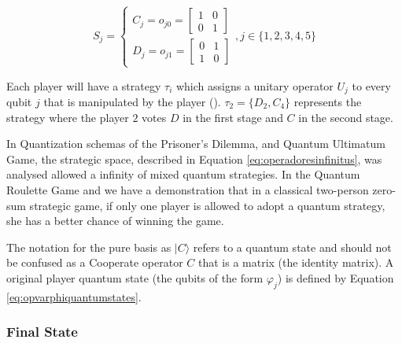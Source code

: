 
\begin{equation}
S_{j} = \begin{cases}
C_{j} = o_{j0}=\left[\begin{array}{cc}
1 & 0\\
0 & 1
\end{array}\right]\\
D_{j} = o_{j1}=\left[\begin{array}{cc}
0 & 1\\
1 & 0
\end{array}\right]
\end{cases} , j \in \{ 1, 2, 3, 4, 5 \}
\label{eq:operators_piratas_quanticos}
\end{equation}

Each player will have a strategy $\tau_{i}$  which assigns a
unitary operator $U_{j}$ to every qubit $j$ that is manipulated
by the player (). $\tau_{2}= \{D_{2},C_{4}\}$ represents the strategy where the player $2$ votes $D$ in the first stage and $C$ in the second stage.


In Quantization schemas of the Prisoner's Dilemma\cite{Letters2002}\cite{Eisert2008}, and Quantum Ultimatum Game\cite{Fra2011}, the strategic space, described in Equation \ref{eq:operadoresinfinitus}, was analysed allowed a infinity of mixed quantum strategies. In the Quantum Roulette Game\cite{Salimi2009} and \cite{Meyer1999} we have a demonstration that in a classical two-person zero-sum strategic game, if only one player is allowed to adopt a quantum strategy, she has a better chance of winning the game. 

The notation for the pure basis as $\vert C\rangle$ refers to a quantum state and should not be confused as a Cooperate operator $C$ that is a matrix (the identity matrix). A original player quantum state (the qubits of the form $\varphi_{j}$) is defined by Equation \ref{eq:opvarphiquantumstates}.





\subsubsection{Final State}
\label{subsec:pirates_finalstate}

